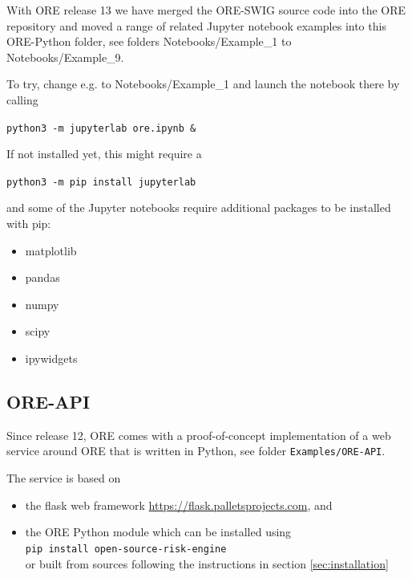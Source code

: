 With ORE release 13 we have merged the ORE-SWIG source code into the ORE repository and moved a range of related
Jupyter notebook examples into this ORE-Python folder, see folders Notebooks/Example\_1 to Notebooks/Example\_9.

To try, change e.g. to Notebooks/Example\_1 and launch the notebook there by calling

\medskip
{\tt python3 -m jupyterlab ore.ipynb \& }

\medskip
If not installed yet, this might require a

\medskip
{\tt python3 -m pip install jupyterlab }

\medskip
and some of the Jupyter notebooks require additional packages to be installed with pip:
\begin{itemize}
\item matplotlib
\item pandas
\item numpy
\item scipy
\item ipywidgets
\end{itemize}

\subsection{ORE-API}\label{example:oreapi}

Since release 12, ORE comes with a proof-of-concept implementation of a web service around ORE
that is written in Python, see folder {\tt Examples/ORE-API}.

The service is based on
\begin{itemize}
\item the flask web framework \url{https://flask.palletsprojects.com}, and
\item the ORE Python module which can be installed using \\
  {\tt pip install open-source-risk-engine} \\
  or built from sources following the instructions in section \ref{sec:installation}
\end{itemize}

